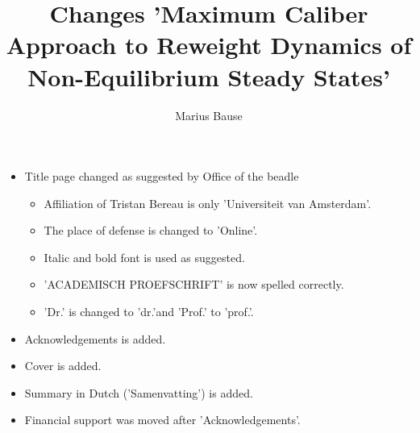 \documentclass[a4paper,10pt]{article}
\title{Changes 'Maximum Caliber Approach to Reweight Dynamics of Non-Equilibrium Steady States'}
\author{Marius Bause}
\begin{document}
\maketitle
\begin{itemize}
 \item Title page changed as suggested by Office of the beadle
 \begin{itemize}
  \item Affiliation of Tristan Bereau is only 'Universiteit van Amsterdam'.
  \item The place of defense is changed to 'Online'.
  \item Italic and bold font is used as suggested.
  \item 'ACADEMISCH PROEFSCHRIFT' is now spelled correctly.
  \item 'Dr.' is changed to 'dr.'and 'Prof.' to 'prof.'. 
  \end{itemize}
\item Acknowledgements is added.
\item Cover is added.
\item Summary in Dutch ('Samenvatting') is added.
\item Financial support was moved after 'Acknowledgements'. 


\end{itemize}
\end{document}
